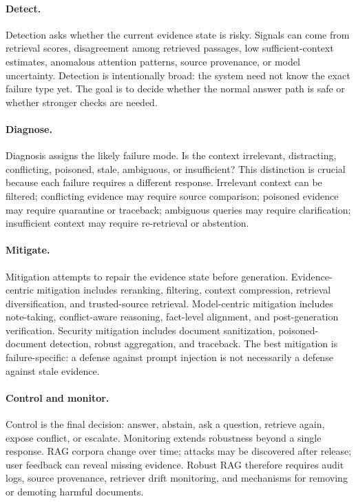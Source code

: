\documentclass[11pt]{article}
\begin{document}


\paragraph{Detect.}
Detection asks whether the current evidence state is risky. Signals can come from retrieval scores, disagreement among retrieved passages, low sufficient-context estimates, anomalous attention patterns, source provenance, or model uncertainty. Detection is intentionally broad: the system need not know the exact failure type yet. The goal is to decide whether the normal answer path is safe or whether stronger checks are needed.

\paragraph{Diagnose.}
Diagnosis assigns the likely failure mode. Is the context irrelevant, distracting, conflicting, poisoned, stale, ambiguous, or insufficient? This distinction is crucial because each failure requires a different response. Irrelevant context can be filtered; conflicting evidence may require source comparison; poisoned evidence may require quarantine or traceback; ambiguous queries may require clarification; insufficient context may require re-retrieval or abstention.

\paragraph{Mitigate.}
Mitigation attempts to repair the evidence state before generation. Evidence-centric mitigation includes reranking, filtering, context compression, retrieval diversification, and trusted-source retrieval. Model-centric mitigation includes note-taking, conflict-aware reasoning, fact-level alignment, and post-generation verification. Security mitigation includes document sanitization, poisoned-document detection, robust aggregation, and traceback. The best mitigation is failure-specific: a defense against prompt injection is not necessarily a defense against stale evidence.

\paragraph{Control and monitor.}
Control is the final decision: answer, abstain, ask a question, retrieve again, expose conflict, or escalate. Monitoring extends robustness beyond a single response. RAG corpora change over time; attacks may be discovered after release; user feedback can reveal missing evidence. Robust RAG therefore requires audit logs, source provenance, retriever drift monitoring, and mechanisms for removing or demoting harmful documents.
\end{document}
